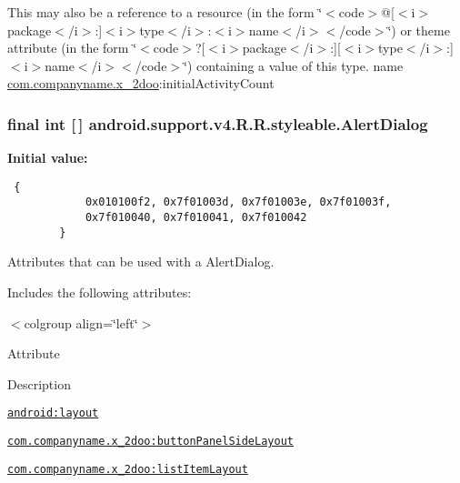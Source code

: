 This may also be a reference to a resource (in the form \char`\"{}$<$code$>$@\mbox{[}$<$i$>$package$<$/i$>$:\mbox{]}$<$i$>$type$<$/i$>$:$<$i$>$name$<$/i$>$$<$/code$>$\char`\"{}) or theme attribute (in the form \char`\"{}$<$code$>$?\mbox{[}$<$i$>$package$<$/i$>$:\mbox{]}\mbox{[}$<$i$>$type$<$/i$>$:\mbox{]}$<$i$>$name$<$/i$>$$<$/code$>$\char`\"{}) containing a value of this type.  name \hyperlink{namespacecom_1_1companyname_1_1x__2doo}{com.companyname.x\_\-2doo}:initialActivityCount \hypertarget{classandroid_1_1support_1_1v4_1_1_r_1_1styleable_984adead369fc9c6b58c85f88690832f}{
\subsubsection[{AlertDialog}]{\setlength{\rightskip}{0pt plus 5cm}final int \mbox{[}$\,$\mbox{]} android.support.v4.R.R.styleable.AlertDialog}}
\label{classandroid_1_1support_1_1v4_1_1_r_1_1styleable_984adead369fc9c6b58c85f88690832f}


\textbf{Initial value:}

\begin{Code}\begin{verbatim} {
            0x010100f2, 0x7f01003d, 0x7f01003e, 0x7f01003f,
            0x7f010040, 0x7f010041, 0x7f010042
        }
\end{verbatim}
\end{Code}
Attributes that can be used with a AlertDialog. 

Includes the following attributes: \begin{TabularC}{0}
\hline
\end{TabularC}
$<$colgroup align=\char`\"{}left\char`\"{}$>$ 

Attribute

Description 

{\tt \hyperlink{classandroid_1_1support_1_1v4_1_1_r_1_1styleable_705bd8f65b9cad04ffe647abf449892c}{android:layout}}

{\tt \hyperlink{classandroid_1_1support_1_1v4_1_1_r_1_1styleable_5035a6dc698e70cff680cbf999f76b5c}{com.companyname.x\_\-2doo:buttonPanelSideLayout}}

{\tt \hyperlink{classandroid_1_1support_1_1v4_1_1_r_1_1styleable_428eb36452bd3ec51c37fc80329506b7}{com.companyname.x\_\-2doo:listItemLayout}}

